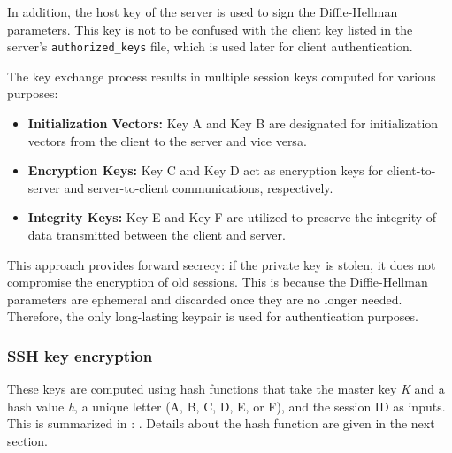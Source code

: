     In addition, the host key of the server is used to sign the Diffie-Hellman parameters. This key is not to be confused with the client key listed in the server's \texttt{authorized\_keys} file, which is used later for client authentication.

    The key exchange process results in multiple session keys computed for various purposes:

    \begin{itemize}
        \item \textbf{Initialization Vectors:} Key A and Key B are designated for initialization vectors from the client to the server and vice versa.
        \item \textbf{Encryption Keys:} Key C and Key D act as encryption keys for client-to-server and server-to-client communications, respectively.
        \item \textbf{Integrity Keys:} Key E and Key F are utilized to preserve the integrity of data transmitted between the client and server.
    \end{itemize}

    This approach provides forward secrecy: if the private key is stolen, it does not compromise the encryption of old sessions. This is because the Diffie-Hellman parameters are ephemeral and discarded once they are no longer needed. Therefore, the only long-lasting keypair is used for authentication purposes.

    \subsubsection{SSH key encryption}
    These keys are computed using hash functions that take the master key \textit{K} and a hash value \textit{h}, a unique letter (A, B, C, D, E, or F), and the session ID as inputs. This is summarized in :
     \cite{OpenSSHUnderHood07}. Details about the hash function are given in the next section.
    
